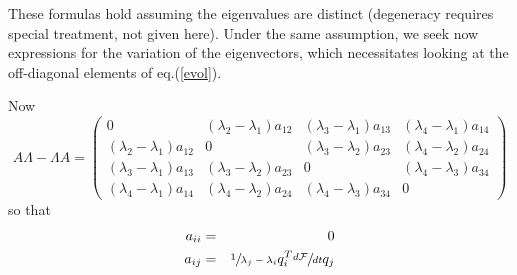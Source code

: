 \documentclass[9pt,lineno]{elife}
\begin{document}
These formulas hold assuming the eigenvalues are distinct (degeneracy requires
special treatment, not given here). Under the same assumption, 
we seek now expressions for the variation of the eigenvectors, which 
necessitates looking at the off-diagonal elements of eq.(\ref{evol}).

Now
\[ A \Lambda - \Lambda A =
\left(
\begin{array}{cccc}
0 & (\lambda_2-\lambda_1)a_{12} & (\lambda_3-\lambda_1)a_{13}&(\lambda_4-\lambda_1)a_{14}\\
(\lambda_2-\lambda_1)a_{12} &0&(\lambda_3-\lambda_2)a_{23}&(\lambda_4-\lambda_2)a_{24}\\
(\lambda_3-\lambda_1)a_{13}&(\lambda_3-\lambda_2)a_{23}&0&(\lambda_4-\lambda_3)a_{34}\\
(\lambda_4-\lambda_1)a_{14}&(\lambda_4-\lambda_2)a_{24}&(\lambda_4-\lambda_3)a_{34}& 0
\end{array} \right)
\]
so that
\begin{eqnarray*}
a_{ii} & = & 0 \\
a_{ij} & = & \sfrac{1}{\lambda_j - \lambda_i}q_i^T\sfrac{d{\cal F}}{dt}q_j
\end{eqnarray*}
\end{document}
